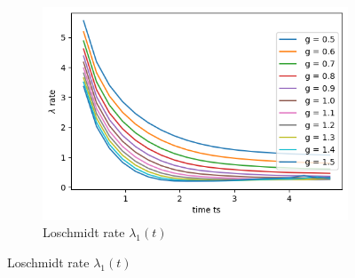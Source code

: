 \begin{figure}[h]
\begin{subfigure}[t]{0.48\textwidth}
        \includegraphics[width=\textwidth]{tex/figures/Lochschmidt1ManyGs.png}
         \caption{Loschmidt rate $\lambda_1(t)$}
    \end{subfigure}
\end{figure}

